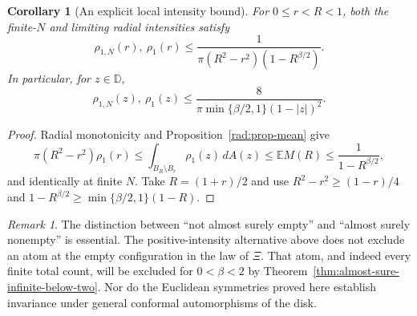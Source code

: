 \documentclass[11pt,a4paper]{article}
\numberwithin{equation}{section}
\newtheorem{corollary}[theorem]{Corollary}
\theoremstyle{definition}
\theoremstyle{remark}
\newtheorem{remark}[theorem]{Remark}
\newcommand{\D}{\mathbb D}
\newcommand{\E}{\mathbb E}
\begin{document}
\begin{corollary}[An explicit local intensity bound]
For $0\leq r<R<1$, both the finite-$N$ and limiting radial intensities satisfy
\[
 \rho_{1,N}(r),\ \rho_1(r)
 \leq\frac{1}{\pi(R^2-r^2)(1-R^{\beta/2})}.
\]
In particular, for $z\in\D$,
\[
 \rho_{1,N}(z),\ \rho_1(z)
 \leq\frac{8}{\pi\min\{\beta/2,1\}(1-|z|)^2}.
\]
\end{corollary}
\begin{proof}
Radial monotonicity and Proposition~\ref{rad:prop-mean} give
\[
 \pi(R^2-r^2)\rho_1(r)
 \leq\int_{B_R\setminus B_r}\rho_1(z)\,dA(z)
 \leq\E M(R)\leq\frac{1}{1-R^{\beta/2}},
\]
and identically at finite $N$. Take $R=(1+r)/2$ and use
$R^2-r^2\geq(1-r)/4$ and
$1-R^{\beta/2}\geq\min\{\beta/2,1\}(1-R)$.
\end{proof}

\begin{remark}
The distinction between ``not almost surely empty'' and ``almost surely
nonempty'' is essential. The positive-intensity alternative above does
not exclude an atom at the empty configuration in the law of $\Xi$.
That atom, and indeed every finite total count, will be excluded for
$0<\beta<2$ by Theorem~\ref{thm:almost-sure-infinite-below-two}.
Nor do the Euclidean symmetries proved here establish invariance under
general conformal automorphisms of the disk.
\end{remark}
\end{document}
